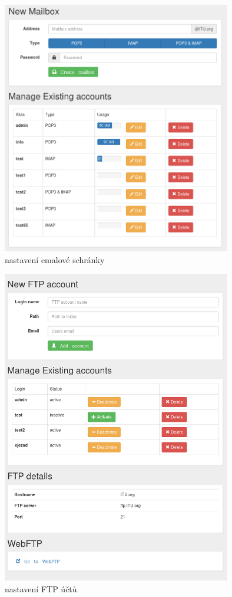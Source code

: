 \documentclass[11pt,a4paper]{article}
\begin{document}
      \begin{figure}[ht]
        \begin{center}
          \includegraphics[width=10cm]{email}
          \caption{nastavení emalové schránky}
          \label{nastaveni-email}
        \end{center}
      \end{figure}

      \begin{figure}[ht]
        \begin{center}
          \includegraphics[width=10cm]{ftp}
          \caption{nastavení FTP účtů}
          \label{sprava-ftp}
        \end{center}
      \end{figure}
\end{document}
